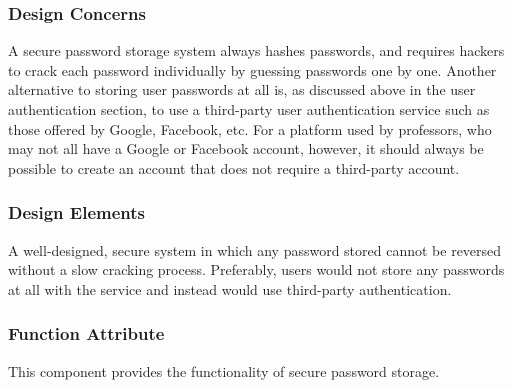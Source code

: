 \documentclass[letterpaper, 10pt, draftclsnofoot, compsoc, onecolumn]{IEEEtran}
\begin{document}
\subsubsection{Design Concerns}
A secure password storage system always hashes passwords, and requires hackers
to crack each password individually by guessing passwords one by one. Another
alternative to storing user passwords at all is, as discussed above in the user
authentication section, to use a third-party user authentication service such as
those offered by Google, Facebook, etc. For a platform used by professors, who
may not all have a Google or Facebook account, however, it should always be
possible to create an account that does not require a third-party account.
{\noindent  \par}

\subsubsection{Design Elements}
A well-designed, secure system in which any password stored cannot be reversed
without a slow cracking process. Preferably, users would not store any passwords
at all with the service and instead would use third-party authentication.
{\noindent  \par}

\subsubsection{Function Attribute}
This component provides the functionality of secure password storage.
{\noindent  \par}
\end{document}
